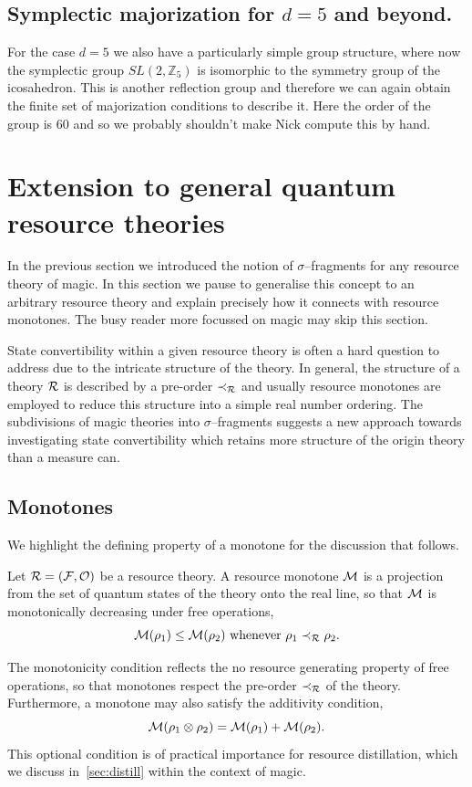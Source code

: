 \documentclass[pra,
aps,
twocolumn,
superscriptaddress,
groupedaddress,
nofootinbib,
reprint
]{revtex4-1}
\begin{document}
\subsection{Symplectic majorization for $d =5$ and beyond.}
For the case $d=5$ we also have a particularly simple group structure, where now the symplectic group $SL(2, \mathbb{Z}_5)$ is isomorphic to the symmetry group of the icosahedron. This is another reflection group and therefore we can again obtain the finite set of majorization conditions to describe it. Here the order of the group is $60$ and so we probably shouldn't make Nick compute this by hand.
\newpage
\section{Extension to general quantum resource theories}
\label{sec:frag}

In the previous section we introduced the notion of $\sigma$--fragments for any resource theory of magic. In this section we pause to generalise this concept to an arbitrary resource theory and explain precisely how it connects with resource monotones. The busy reader more focussed on magic may skip this section.

State convertibility within a given resource theory is often a hard question to address due to the intricate structure of the theory.
In general, the structure of a theory $\mathcal{R}$ is described by a pre-order $\prec_{\mathcal{R}}$ and usually resource monotones are employed to reduce this structure into a simple real number ordering.
The subdivisions of magic theories into $\sigma$--fragments suggests a new approach towards investigating state convertibility which retains more structure of the origin theory than a measure can.

\subsection{Monotones}\label{sec:mono}

We highlight the defining property of a monotone for the discussion that follows.
\begin{definition}\label{def:mono}
    Let $\mathcal{R} = (\mathcal{F}, \mathcal{O})$ be a resource theory.
    A resource monotone $\mathcal{M}$ is a projection from the set of quantum states of the theory onto the real line, so that $\mathcal{M}$ is monotonically decreasing under free operations,
    \begin{equation}
        \mathcal{M}(\rho_1) \leq \mathcal{M}(\rho_2)\ \text{whenever}\ \rho_1 \prec_{\mathcal{R}} \rho_2.
    \end{equation}
\end{definition}
The monotonicity condition reflects the no resource generating property of free operations, so that monotones respect the pre-order $\prec_{\mathcal{R}}$ of the theory.
Furthermore, a monotone may also satisfy the additivity condition,
\begin{equation}
    \mathcal{M}(\rho_1 \otimes \rho_2) = \mathcal{M}(\rho_1) + \mathcal{M}(\rho_2).
\end{equation}
This optional condition is of practical importance for resource distillation, which we discuss in~\cref{sec:distill} within the context of magic.
\end{document}
